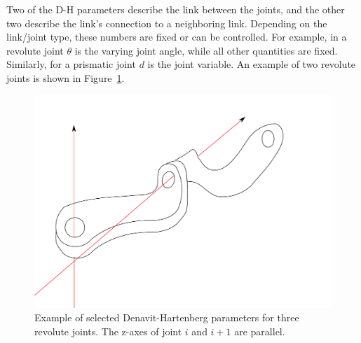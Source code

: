 Two of the D-H parameters describe the link between the joints, and the other two describe the link's connection to a neighboring link. Depending on the link/joint type, these numbers are fixed or can be controlled. For example, in a revolute joint $ \theta$ is the varying joint angle, while all other quantities are fixed.  Similarly, for a prismatic joint $ d$ is the joint variable. An example of two revolute joints is shown in Figure~\ref{fig:denavit}.

\begin{figure}
    \centering
        \includegraphics[width=\textwidth]{figs/denavit-hartenberg}
    \caption{Example of selected Denavit-Hartenberg parameters for three revolute joints. The z-axes of joint $i$ and $i+1$ are parallel.
    \label{fig:denavit}}
\end{figure}



